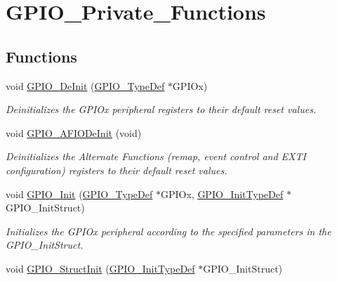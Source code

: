 \hypertarget{group___g_p_i_o___private___functions}{}\section{G\+P\+I\+O\+\_\+\+Private\+\_\+\+Functions}
\label{group___g_p_i_o___private___functions}
\subsection*{Functions}
\begin{DoxyCompactItemize}
\item 
void \mbox{\hyperlink{group___g_p_i_o___private___functions_gaa60bdf3182c44b5fa818f237042f52ee}{G\+P\+I\+O\+\_\+\+De\+Init}} (\mbox{\hyperlink{struct_g_p_i_o___type_def}{G\+P\+I\+O\+\_\+\+Type\+Def}} $\ast$G\+P\+I\+Ox)
\begin{DoxyCompactList}\small\item\em Deinitializes the G\+P\+I\+Ox peripheral registers to their default reset values. \end{DoxyCompactList}\item 
void \mbox{\hyperlink{group___g_p_i_o___private___functions_ga7f645e6b6146818c3d6c19021e70170c}{G\+P\+I\+O\+\_\+\+A\+F\+I\+O\+De\+Init}} (void)
\begin{DoxyCompactList}\small\item\em Deinitializes the Alternate Functions (remap, event control and E\+X\+TI configuration) registers to their default reset values. \end{DoxyCompactList}\item 
void \mbox{\hyperlink{group___g_p_i_o___private___functions_ga71abf9404261370d03cca449b88d3a65}{G\+P\+I\+O\+\_\+\+Init}} (\mbox{\hyperlink{struct_g_p_i_o___type_def}{G\+P\+I\+O\+\_\+\+Type\+Def}} $\ast$G\+P\+I\+Ox, \mbox{\hyperlink{struct_g_p_i_o___init_type_def}{G\+P\+I\+O\+\_\+\+Init\+Type\+Def}} $\ast$G\+P\+I\+O\+\_\+\+Init\+Struct)
\begin{DoxyCompactList}\small\item\em Initializes the G\+P\+I\+Ox peripheral according to the specified parameters in the G\+P\+I\+O\+\_\+\+Init\+Struct. \end{DoxyCompactList}\item 
void \mbox{\hyperlink{group___g_p_i_o___private___functions_gab28de41278e7f8c63d0851e2733b10df}{G\+P\+I\+O\+\_\+\+Struct\+Init}} (\mbox{\hyperlink{struct_g_p_i_o___init_type_def}{G\+P\+I\+O\+\_\+\+Init\+Type\+Def}} $\ast$G\+P\+I\+O\+\_\+\+Init\+Struct)

\end{DoxyCompactItemize}
